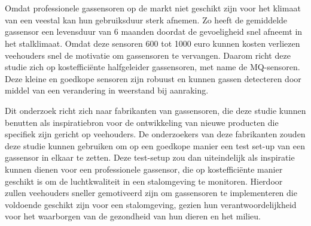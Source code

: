 

\section{}%
\label{sec:probleemstelling}


Omdat professionele gassensoren op de markt niet geschikt zijn voor het klimaat van een veestal kan hun gebruiksduur sterk afnemen. Zo heeft de gemiddelde gassensor een levensduur van 6 maanden doordat de gevoeligheid snel afneemt in het stalklimaat. Omdat deze sensoren 600 tot 1000 euro kunnen kosten verliezen veehouders snel de motivatie om gassensoren te vervangen. Daarom richt deze studie zich op kostefficiënte halfgeleider gassensoren, met name de MQ-sensoren. Deze kleine en goedkope sensoren zijn robuust en kunnen gassen detecteren door middel van een verandering in weerstand bij aanraking.

Dit onderzoek richt zich naar fabrikanten van gassensoren, die deze studie kunnen benutten als inspiratiebron voor de ontwikkeling van nieuwe producten die specifiek zijn gericht op veehouders. De onderzoekers van deze fabrikanten zouden deze studie kunnen gebruiken om op een goedkope manier een test set-up van een gassensor in elkaar te zetten. Deze test-setup zou dan uiteindelijk als inspiratie kunnen dienen voor een professionele gassensor, die op kostefficiënte manier geschikt is om de luchtkwaliteit in een stalomgeving te monitoren. Hierdoor zullen veehouders sneller gemotiveerd zijn om gassensoren te implementeren die voldoende geschikt zijn voor een stalomgeving, gezien hun verantwoordelijkheid voor het waarborgen van de gezondheid van hun dieren en het milieu.



